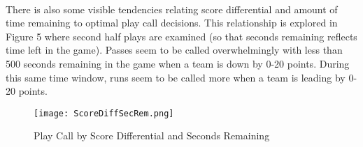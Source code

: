 \documentclass[11pt]{article}
\begin{document}
\begin{multicols*}{2}
                \vspace{-10pt}
                \paragraph{}
                    There is also some visible tendencies relating score differential and amount of time remaining to optimal play call decisions. 
                    This relationship is explored in Figure 5 where second half plays are examined (so that seconds remaining reflects time left in the game).
                    Passes seem to be called overwhelmingly with less than 500 seconds remaining in the game when a team is down by 0-20 points. 
                    During this same time window, runs seem to be called more when a team is leading by 0-20 points.
                    
                    \end{multicols*}
                    \begin{figure}[ht]
                        \texttt{[image: ScoreDiffSecRem.png]}
                        \caption{Play Call by Score Differential and Seconds Remaining}
                        \label{fig:Play Call by Score Differential and Seconds Remaining}
                    \end{figure}
                    \begin{multicols*}{2}

                \paragraph{}
                    
                     



                    


                    



\end{multicols*}
\end{document}
